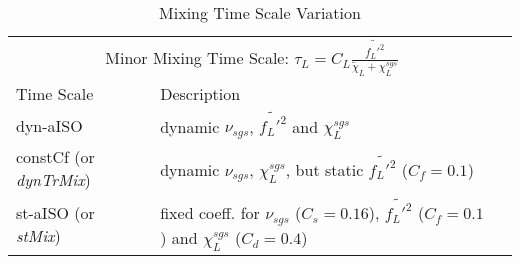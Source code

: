 \begin{table}[hbt]
    \caption{Mixing Time Scale Variation}
    \centering
    \begin{tabular}{llr}
        \toprule
        \multicolumn{2}{c}{Minor Mixing Time Scale: $\tau_L = C_{L} \frac{\widetilde{f_L'^2} }{\tilde{\chi}_L + \chi^{sgs}_L}$} \\
        \cmidrule(r){1-2}
        Time Scale & Description \\
        \midrule
        dyn-aISO  & dynamic $\nu_{sgs}$, $\widetilde{f_L'^2}$ and $\chi^{sgs}_L$ \\
        constCf (or \textit{dynTrMix}) & dynamic $\nu_{sgs}$, $\chi^{sgs}_L$, but static $\widetilde{f_L'^2}$ ($C_f=0.1$) \\
        st-aISO (or \textit{stMix}) & fixed coeff. for $\nu_{sgs}$ ($C_s=0.16$), $\widetilde{f_L'^2}$ ($C_f=0.1$) and $\chi^{sgs}_L$ ($C_d=0.4$) \\
        \bottomrule
    \end{tabular}
    \label{tab:label}
\end{table}